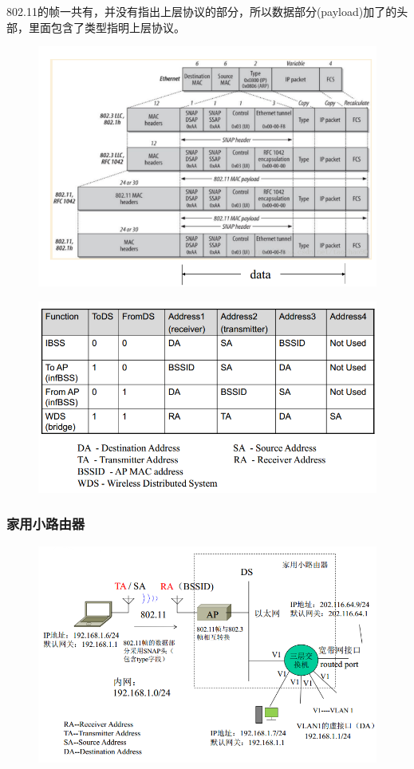 802.11的帧一共有，并没有指出上层协议的部分，所以数据部分(payload)加了的头部，里面包含了类型指明上层协议。

\begin{figure}[H]
    \centering
    \includegraphics[width=0.8\linewidth]{fig/802-11-frame-2.png}
\end{figure}
\begin{figure}[H]
    \centering
    \includegraphics[width=0.8\linewidth]{fig/802-11-frame-3.png}
\end{figure}

\subsubsection{家用小路由器}
\begin{figure}[H]
    \centering
    \includegraphics[width=0.8\linewidth]{fig/wlan-example.png}
\end{figure}

